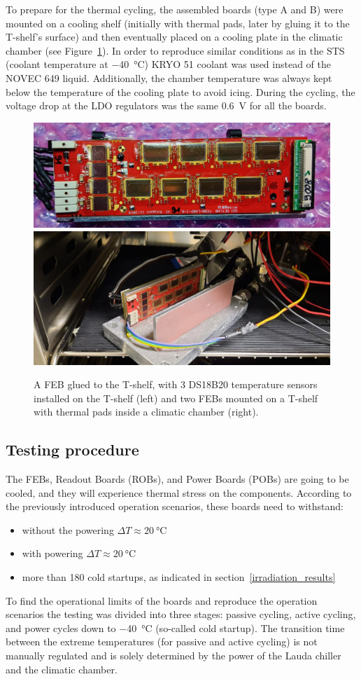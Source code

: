 \newpage
To prepare for the thermal cycling, the assembled boards (type A and B) were mounted on a cooling shelf (initially with thermal pads, later by gluing it to the T-shelf’s surface) and then eventually placed on a cooling plate in the climatic chamber (see Figure~\ref{fig_cycling_temps}). In order to reproduce similar conditions as in the \gls{STS} (coolant temperature at \SI{-40}{\celsius}) KRYO 51 coolant was used instead of the NOVEC 649 liquid. Additionally, the chamber temperature was always kept below the temperature of the cooling plate to avoid icing. During the cycling, the voltage drop at the \gls{LDO} regulators was the same \SI{0.6}{\volt} for all the boards.

\begin{figure}[!h]
\centering
\includegraphics[width=0.5\columnwidth]{Chapter4/images/FEBB_T_sensors.jpeg}
\includegraphics[width=0.4\columnwidth]{Chapter4/images/thermal_setup.jpeg}
\caption{A \gls{FEB} glued to the T-shelf, with 3 DS18B20 temperature sensors installed on the T-shelf (left) and two \gls{FEB}s mounted on a T-shelf with thermal pads inside a climatic chamber (right).}
\label{fig_cycling_temps}
\end{figure}


\subsection{Testing procedure}
The \glspl{FEB}, Readout Boards (\glspl{ROB}), and  Power Boards (\glspl{POB}) are going to be cooled, and they will experience thermal stress on the components. According to the previously introduced operation scenarios, these boards need to withstand:
\begin{itemize}
    \item without the powering $\Delta T\approx\SI{20}{\celsius} $
    \item with powering $\Delta T\approx\SI{20}{\celsius} $
    \item more than 180 cold startups, as indicated in section~\ref{irradiation_results}
\end{itemize}
To find the operational limits of the boards and reproduce the operation scenarios the testing was divided into three stages: passive cycling, active cycling, and power cycles down to \SI{-40}{\celsius} (so-called cold startup). The transition time between the extreme temperatures (for passive and active cycling) is not manually regulated and is solely determined by the power of the Lauda chiller and the climatic chamber.

